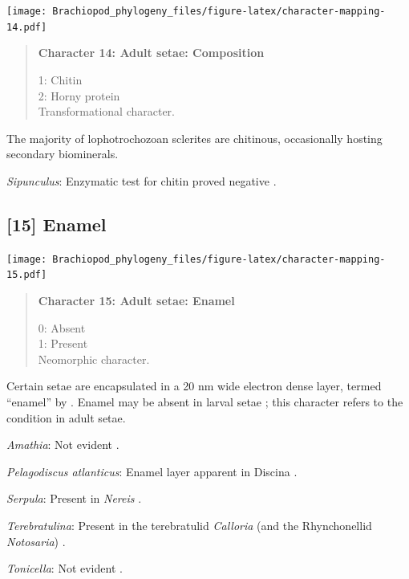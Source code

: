 \documentclass[openany]{book}
\begin{document}
\texttt{[image: Brachiopod\_phylogeny\_files/figure-latex/character-mapping-14.pdf]}

\begin{quote}
\textbf{Character 14: Adult setae: Composition}

1: Chitin\\
2: Horny protein\\
Transformational character.
\end{quote}

The majority of lophotrochozoan sclerites are chitinous, occasionally
hosting secondary biominerals.

\hypertarget{Sipunculus-coding-14}{}
\emph{Sipunculus}: Enzymatic test for chitin proved negative
\citep{Rice1993}.

\subsection*{{[}15{]} Enamel}\label{enamel}

\texttt{[image: Brachiopod\_phylogeny\_files/figure-latex/character-mapping-15.pdf]}

\begin{quote}
\textbf{Character 15: Adult setae: Enamel}

0: Absent\\
1: Present\\
Neomorphic character.
\end{quote}

Certain setae are encapsulated in a 20 nm wide electron dense layer,
termed ``enamel'' by \citet{Gustus1973}. Enamel may be absent in larval
setae \citep{Luter2003}; this character refers to the condition in adult
setae.

\hypertarget{Amathia-coding-15}{}
\emph{Amathia}: Not evident \citep{Gordon1975}.

\hypertarget{Pelagodiscus_atlanticus-coding-15}{}
\emph{Pelagodiscus atlanticus}: Enamel layer apparent in Discina
\citep[fig. 47.1]{Williams1997Introduction}.

\hypertarget{Serpula-coding-15}{}
\emph{Serpula}: Present in \emph{Nereis} \citep{Gustus1973}.

\hypertarget{Terebratulina-coding-15}{}
\emph{Terebratulina}: Present in the terebratulid \emph{Calloria} (and
the Rhynchonellid \emph{Notosaria}) \citep{Luter2000}.

\hypertarget{Tonicella-coding-15}{}
\emph{Tonicella}: Not evident \citep{Leise1988, Fischer1980}.
\end{document}
